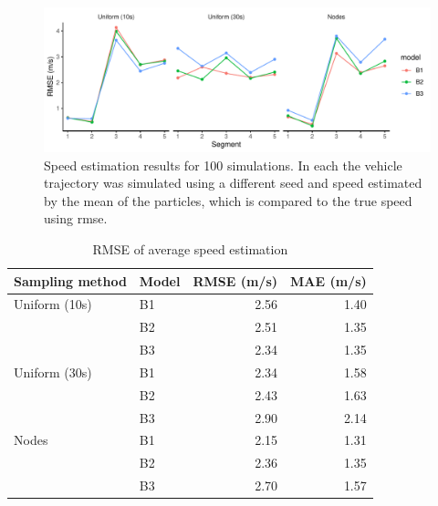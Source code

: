 \begin{knitrout}\small
{}\color{fgcolor}\begin{figure}
\includegraphics[width=\maxwidth]{figure/sim2_pf_full-1} \caption[Results for simulation B replicated 100~times]{Speed estimation results for 100 simulations. In each the vehicle trajectory was simulated using a different seed and speed estimated by the mean of the particles, which is compared to the true speed using \gls{rmse}.}\label{fig:sim2_pf_full}
\end{figure}

\begin{table}

\caption{\label{tab:sim2_pf_full}RMSE of average speed estimation}
\centering
\fontsize{8}{10}\selectfont
\begin{tabular}[t]{llrr}
\toprule
Sampling method & Model & RMSE (m/s) & MAE (m/s)\\
\midrule
Uniform (10s) & B1 & 2.56 & 1.40\\
 & B2 & 2.51 & 1.35\\
 & B3 & 2.34 & 1.35\\
\midrule
Uniform (30s) & B1 & 2.34 & 1.58\\
 & B2 & 2.43 & 1.63\\
 & B3 & 2.90 & 2.14\\
\midrule
Nodes & B1 & 2.15 & 1.31\\
 & B2 & 2.36 & 1.35\\
 & B3 & 2.70 & 1.57\\
\bottomrule
\end{tabular}
\end{table}


\end{knitrout}







